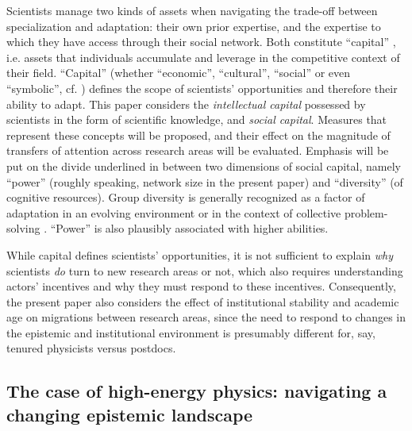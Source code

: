 \documentclass{article}
\begin{document}
Scientists manage two kinds of assets when navigating the trade-off between specialization and adaptation: their own prior expertise, and the expertise to which they have access through their social network. Both constitute ``capital'' \citep{Bourdieu1986}, i.e. assets that individuals accumulate and leverage in the competitive context of their field. ``Capital''  (whether ``economic'', ``cultural'', ``social'' or even ``symbolic'', cf. \citealt{Bourdieu1986}) defines the scope of scientists' opportunities and therefore their ability to adapt. This paper considers the \textit{intellectual capital} possessed by scientists in the form of scientific knowledge, and \textit{social capital}. %
Measures that represent these concepts will be proposed, and their effect on the magnitude of transfers of attention across research areas will be evaluated. Emphasis will be put on the divide underlined in \citealt{Abbasi2014} between two dimensions of social capital, namely ``power'' (roughly speaking, network size in the present paper) and ``diversity'' (of cognitive resources). Group diversity is generally recognized as a factor of adaptation in an evolving environment or in the context of collective problem-solving \citep{Smaldino2023,Schimmelpfennig2021,Muthukrishna2016,page2008difference}. ``Power'' is also plausibly associated with higher abilities.

While capital defines scientists' opportunities, it is not sufficient to explain \textit{why} scientists \textit{do} turn to new research areas or not, which also requires understanding actors' incentives and why they must respond to these incentives. Consequently, the present paper also considers the effect of institutional stability and academic age on migrations between research areas, since the need to respond to changes in the epistemic and institutional environment is presumably different for, say, tenured physicists versus postdocs. %



\subsection{\label{sec:hep}The case of high-energy physics: navigating a changing epistemic landscape}
\end{document}
